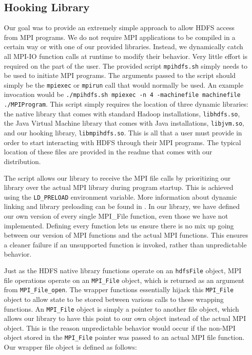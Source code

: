\subsection{Hooking Library}
Our goal was to provide an extremely simple approach to allow HDFS access
from MPI programs. We do not require MPI applications to be compiled in a
certain way or with one of our provided libraries. Instead, we dynamically catch
all MPI-IO function calls at runtime to modify their behavior. Very little
effort is required on the part of the user. The provided script
\texttt{mpihdfs.sh} simply needs to be used to initiate MPI programs. The
arguments passed to the script should simply be the \texttt{mpiexec} or
\texttt{mpirun} call that would normally be used. An example invocation would be
\texttt{./mpihdfs.sh mpiexec -n 4 -machinefile machinefile ./MPIProgram}. This
script simply requires the location of three dynamic libraries: the native library
that comes with standard Hadoop installations, \texttt{libhdfs.so}, the Java
Virtual Machine library that comes with Java installations, \texttt{libjvm.so},
and our hooking library, \texttt{libmpihdfs.so}. This is all that a user must
provide in order to start interacting with HDFS through their MPI programs. The
typical location of these files are provided in the readme that comes with our
distribution.

The script allows our library to receive the MPI file calls by prioritizing our
library over the actual MPI library during program startup. This is achieved
using the \texttt{LD\_PRELOAD} environment variable. More information about
dynamic linking and library preloading can be found in \cite{ld.so}. In our
library, we have defined our own version of every single MPI\_File function,
even those we have not implemented. Defining every function lets us ensure there
is no mix up going between our version of MPI functions and the actual MPI
functions. This ensures a cleaner failure if an unsupported function is invoked,
rather than unpredictable behavior. 

Just as the HDFS native library functions operate on an \texttt{hdfsFile}
object, MPI file operations operate on an \texttt{MPI\_File} object, which is
returned as an argument from \texttt{MPI\_File\_open}. The wrapper functions
essentially hijack this \texttt{MPI\_File} object to allow state to be stored
between various calls to these wrapping functions. An \texttt{MPI\_File} object
is simply a pointer to another file object, which allows our library to 
have this point to our own object instead of the actual MPI object. This is the
reason unpredictable behavior would occur if the non-MPI object stored in the
\texttt{MPI\_File} pointer was passed to an actual MPI file function. Our
wrapper file object is defined as follows:

